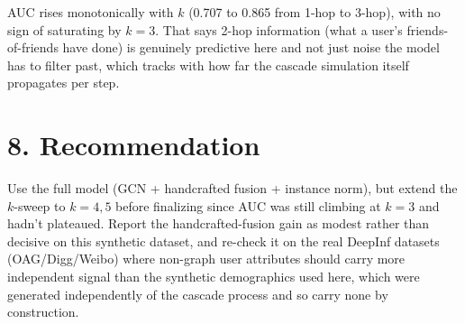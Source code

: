 \documentclass[11pt]{article}
\begin{document}
AUC rises monotonically with $k$ (0.707 to 0.865 from 1-hop to 3-hop), with no sign of saturating by $k=3$. That says 2-hop information (what a user's friends-of-friends have done) is genuinely predictive here and not just noise the model has to filter past, which tracks with how far the cascade simulation itself propagates per step.

\section*{8. Recommendation}
Use the full model (GCN + handcrafted fusion + instance norm), but extend the $k$-sweep to $k=4,5$ before finalizing since AUC was still climbing at $k=3$ and hadn't plateaued. Report the handcrafted-fusion gain as modest rather than decisive on this synthetic dataset, and re-check it on the real DeepInf datasets (OAG/Digg/Weibo) where non-graph user attributes should carry more independent signal than the synthetic demographics used here, which were generated independently of the cascade process and so carry none by construction.
\end{document}

